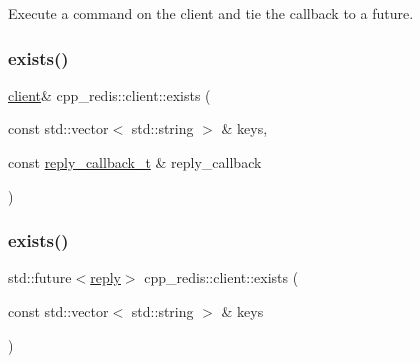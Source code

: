 Execute a command on the client and tie the callback to a future. 

\mbox{\label{classcpp__redis_1_1client_a11836c341d54a9d767cd37508bf87d73}} 
\subsubsection{\texorpdfstring{exists()}{exists()}\hspace{0.1cm}{\footnotesize\ttfamily [1/2]}}
{\footnotesize\ttfamily \hyperlink{classcpp__redis_1_1client}{client}\& cpp\+\_\+redis\+::client\+::exists (\begin{DoxyParamCaption}\item[{const std\+::vector$<$ std\+::string $>$ \&}]{keys,  }\item[{const \hyperlink{classcpp__redis_1_1client_a061a1140d36d2eaeda82b09a0bb3f9f2}{reply\+\_\+callback\+\_\+t} \&}]{reply\+\_\+callback }\end{DoxyParamCaption})}

\mbox{\label{classcpp__redis_1_1client_a16ab72e15bd14a3fd2eb97194cea3d2d}} 
\subsubsection{\texorpdfstring{exists()}{exists()}\hspace{0.1cm}{\footnotesize\ttfamily [2/2]}}
{\footnotesize\ttfamily std\+::future$<$\hyperlink{classcpp__redis_1_1reply}{reply}$>$ cpp\+\_\+redis\+::client\+::exists (\begin{DoxyParamCaption}\item[{const std\+::vector$<$ std\+::string $>$ \&}]{keys }\end{DoxyParamCaption})}

\mbox{\label{classcpp__redis_1_1client_ab2c50e9f37a4e6a5dff059c991dbd15e}} 
